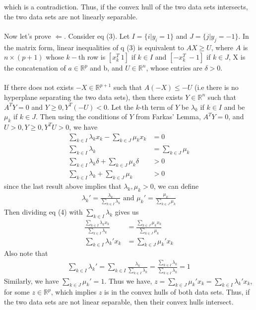 \documentclass[11pt, a4paper]{article}
\begin{document}
which is a contradiction. Thus, if the convex hull of the two data sets intersects, the two data sets are not linearly separable. \\ \\
Now let's prove $\Leftarrow$. Consider eq (3). Let $I = \{i| y_i = 1\}$ and $J = \{j| y_j = - 1\}$. In the matrix form, linear inequalities of q (3) is equivalent to $AX \ge U$, where $A$ is $n \times (p+1)$ whose $k-$th row is $[x_k^T\ 1]$ if $k \in I$ and $[-x_k^T\ -1]$ if $k \in J$, X is the concatenation of $a \in \mathbb{R}^p$ and b, and $U \in \mathbb{R}^n$, whose entries are $\delta >0$. \\ \\
If there does not exists $ -X \in \mathbb{R}^{p+1}$ such that $A (-X) \le -U$ (i.e there is no hyperplane separating the two data sets), then there exists $Y \in \mathbb{R}^n$ such that $A^T Y = 0$ and $Y \ge 0, Y^T (-U) <0$. Let the $k$-th term of $Y$ be $\lambda_k$ if $k \in I$ and be $\mu_k$ if $k\in J$. Then using the conditions of $Y$ from Farkas' Lemma, $A^T Y = 0$, and $U > 0, Y \ge 0, Y^T U > 0$, we have
\begin{align}
\sum_{k\in I}\lambda_k x_k - \sum_{k\in J} \mu_k x_k &= 0\\ \sum_{k\in I}\lambda_k &= \sum_{k\in J} \mu_k\\
\sum_{k\in I}\lambda_k\delta + \sum_{k\in J} \mu_k\delta &> 0 \\
\sum_{k\in I}\lambda_k + \sum_{k\in J} \mu_k &> 0
\end{align}
since the last result above implies that $\lambda_k, \mu_k >0$, we can define\begin{align*}
\lambda_k' = \frac{\lambda_k}{\sum_{k\in I} \lambda_k} \text{ and } \mu_k' = \frac{\mu_k}{\sum_{k\in J} \mu_k}
\end{align*}
Then dividing eq (4) with $\sum_{k\in I} \lambda_k$ gives us\begin{align*}
\frac{\sum_{k\in I}\lambda_k x_k}{\sum_{k\in I}\lambda_k } &= \frac{\sum_{k\in J}\mu_k x_k}{\sum_{k\in J}\mu_k }\\
\sum_{k\in I} \lambda_k' x_k &= \sum_{k\in J} \mu_k' x_k
\end{align*}
Also note that\begin{align*}
\sum_{k\in I} \lambda_k' = \sum_{k \in I} \frac{\lambda_k}{\sum_{k\in I} \lambda_k} = \frac{\sum_{k\in I} \lambda_k}{\sum_{k\in I} \lambda_k} = 1
\end{align*}
Similarly, we have $\sum_{k\in J}\mu_k' =1$. Thus we have, $z =\sum_{k\in J}\mu_k' x_k = \sum_{k\in I}\lambda_k' x_k$, for some $z \in \mathbb{R}^p$, which implies $z$ is in the convex hulls of both data sets. Thus, if the two data sets are not linear separable, then their convex hulls intersect.\QEDB
\end{document}
